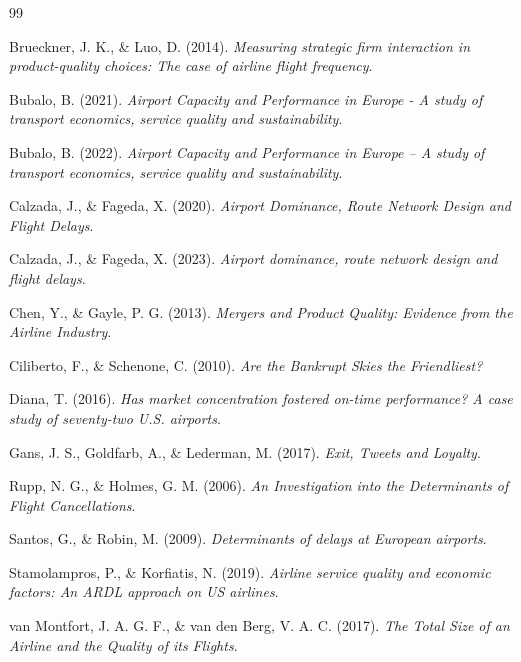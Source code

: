 \documentclass[preprint,12pt,authoryear]{elsarticle}
\begin{document}
\newpage
\begin{thebibliography}{99}

Brueckner, J. K., \& Luo, D. (2014). 
\textit{Measuring strategic firm interaction in product-quality choices: The case of airline flight frequency}.

Bubalo, B. (2021). 
\textit{Airport Capacity and Performance in Europe - A study of transport economics, service quality and sustainability}.

Bubalo, B. (2022). 
\textit{Airport Capacity and Performance in Europe -- A study of transport economics, service quality and sustainability}.

Calzada, J., \& Fageda, X. (2020). 
\textit{Airport Dominance, Route Network Design and Flight Delays}.

Calzada, J., \& Fageda, X. (2023). 
\textit{Airport dominance, route network design and flight delays}.

Chen, Y., \& Gayle, P. G. (2013). 
\textit{Mergers and Product Quality: Evidence from the Airline Industry}.

Ciliberto, F., \& Schenone, C. (2010). 
\textit{Are the Bankrupt Skies the Friendliest?}

Diana, T. (2016). 
\textit{Has market concentration fostered on-time performance? A case study of seventy-two U.S. airports}.

Gans, J. S., Goldfarb, A., \& Lederman, M. (2017). 
\textit{Exit, Tweets and Loyalty}.

Rupp, N. G., \& Holmes, G. M. (2006). 
\textit{An Investigation into the Determinants of Flight Cancellations}.

Santos, G., \& Robin, M. (2009). 
\textit{Determinants of delays at European airports}.

Stamolampros, P., \& Korfiatis, N. (2019). 
\textit{Airline service quality and economic factors: An ARDL approach on US airlines}.

van Montfort, J. A. G. F., \& van den Berg, V. A. C. (2017). 
\textit{The Total Size of an Airline and the Quality of its Flights}.

\end{thebibliography}


\clearpage
\appendix
\label{sec:appendix}

\end{document}
